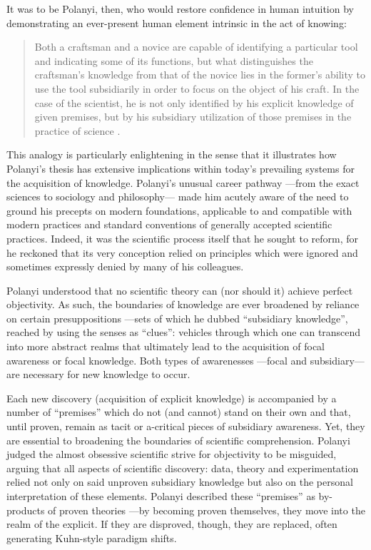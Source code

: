 It was to be Polanyi, then, who would restore confidence in human intuition by demonstrating an ever-present human element intrinsic in the act of knowing:

\begin{quote}
Both a craftsman and a novice are capable of identifying a particular tool and indicating some of its functions, but what distinguishes the craftsman's knowledge from that of the novice lies in the former's ability to use the tool subsidiarily in order to focus on the object of his craft. In the case of the scientist, he is not only identified by his explicit knowledge of given premises, but by his subsidiary utilization of those premises in the practice of science \citep[pp23-24]{kane84}.
\end{quote}

This analogy is particularly enlightening in the sense that it illustrates how Polanyi's thesis has extensive implications within today's prevailing systems for the acquisition of knowledge. Polanyi's unusual career pathway ---from the exact sciences to sociology and philosophy--- made him acutely aware of the need to ground his precepts on modern foundations, applicable to and compatible with modern practices and standard conventions of generally accepted scientific practices. Indeed, it was the scientific process itself that he sought to reform, for he reckoned that its very conception relied on principles which were ignored and sometimes expressly denied by many of his colleagues. 

Polanyi understood that no scientific theory can (nor should it) achieve perfect objectivity. As such, the boundaries of knowledge are ever broadened by reliance on certain presuppositions ---sets of which he dubbed ``subsidiary knowledge'', reached by using the senses as ``clues'': vehicles through which one can transcend into more abstract realms that ultimately lead to the acquisition of focal awareness or focal knowledge. Both types of awarenesses ---focal and subsidiary--- are necessary for new knowledge to occur.

Each new discovery (acquisition of explicit knowledge) is accompanied by a number of ``premises'' which do not (and cannot) stand on their own and that, until proven, remain as tacit or a-critical pieces of subsidiary awareness. Yet, they are essential to broadening the boundaries of scientific comprehension. Polanyi judged the almost obsessive scientific strive for objectivity to be misguided, arguing that all aspects of scientific discovery: data, theory and experimentation relied not only on said unproven subsidiary knowledge but also on the personal interpretation of these elements. Polanyi described these ``premises'' as by-products of proven theories ---by becoming proven themselves, they move into the realm of the explicit. If they are disproved, though, they are replaced, often generating Kuhn-style paradigm shifts.

